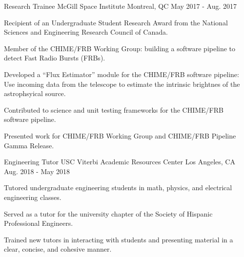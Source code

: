 \begin{cventries}
  \cventry
    {Research Trainee} %
    {McGill Space Institute} %
    {Montreal, QC} %
    {May 2017 - Aug. 2017} %
    {
      \begin{cvitems} %
        \item {Recipient of an Undergraduate Student Research Award from the National Sciences and Engineering Research Council of Canada.}
        \item {Member of the CHIME/FRB Working Group: building a software pipeline to detect Fast Radio Bursts (FRBs).}
        \item {Developed a ``Flux Estimator'' module for the CHIME/FRB software pipeline: Use incoming data from the telescope to estimate the intrinsic brightnes of the astrophsyical source.}
        \item {Contributed to science and unit testing frameworks for the CHIME/FRB software pipeline.}
        \item {Presented work for CHIME/FRB Working Group and CHIME/FRB Pipeline Gamma Release.}
      \end{cvitems}
    }

  \cventry
    {Engineering Tutor} %
    {USC Viterbi Academic Resources Center} %
    {Los Angeles, CA} %
    {Aug. 2018 - May 2018} %
    {
      \begin{cvitems} %
        \item {Tutored undergraduate engineering students in math, physics, and electrical engineering classes.}
        \item {Served as a tutor for the university chapter of the Society of Hispanic Professional Engineers.}
        \item {Trained new tutors in interacting with students and presenting material in a clear, concise, and cohesive manner.}
      \end{cvitems}
    }


\end{cventries}
